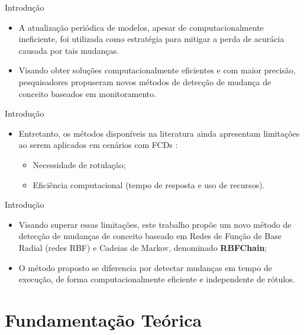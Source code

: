 \documentclass[10pt]{beamer}
\begin{document}
\begin{frame}{Introdução}
    \begin{itemize}
        \item<1 -> A atualização periódica de modelos, apesar de computacionalmente ineficiente, foi utilizada como estratégia para mitigar a perda de acurácia causada por tais mudanças.
        \item<2 -> Visando obter soluções computacionalmente eficientes e com maior precisão, pesquisadores propuseram novos métodos de detecção de mudança de conceito baseados em monitoramento.
      \end{itemize}
\end{frame}


\begin{frame}{Introdução}
    \begin{itemize}
        \item<1 -> Entretanto, os métodos disponíveis na literatura ainda apresentam limitações ao serem aplicados em cenários com FCDs \cite{Aggarwal:2006:DSM:1196418}:
        \begin{itemize}
            \item<2 -> Necessidade de rotulação;
            \item<2 -> Eficiência computacional (tempo de resposta e uso de recursos).
        \end{itemize}
      \end{itemize}
\end{frame}

\begin{frame}{Introdução}
    \begin{itemize}
        \item<1 -> Visando superar essas limitações, este trabalho propõe um novo método de detecção de mudanças de conceito baseado em \alert{Redes de Função de Base Radial (redes RBF) e Cadeias de Markov}, denominado \textbf{\alert{RBFChain}};
        \item<2 -> O método proposto se diferencia por detectar mudanças em tempo de execução, de forma computacionalmente eficiente e independente de rótulos.
    \end{itemize}
\end{frame}

\section{Fundamentação Teórica}
\end{document}
